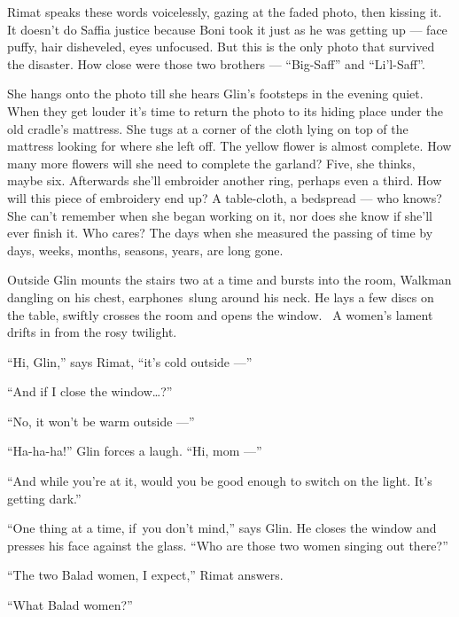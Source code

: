 \documentclass[twoside,11pt,openany]{book}
\begin{document}
Rimat speaks these words voicelessly, gazing at the faded photo, then kissing it.
It doesn't do Saffia
justice because Boni took it just as he was getting up --- face
puffy, hair disheveled,
eyes unfocused. But this is the only photo that survived the
disaster. How close were those two brothers --- ``Big-Saff{}''
and ``Li'l-Saff''.

S{he hangs onto the photo till she hears Glin's footsteps in the
evening quiet. When }they get louder {it's time to return the photo
to its hiding place under the old cradle's mattress. She tugs at a corner of
the}{ }cloth lying on top of the
mattress{ looking for where she left off. The yellow flower is almost
complete. How many more flowers will she need} {to complete the
garland? Five, she }thinks{, maybe six. Afterwards she'll embroider
another }ring, p{erhaps even a third.
}How{ will this piece of embroidery
end }up?{ }A{
table{}-cloth,} a {bedspread --- who knows? She can't remember when
she began working on }it, nor does she know if she'll {ever finish
it. Who cares? }The days when she measured the passing of time by days, weeks, months, seasons, years,  are long
gone.

{Outside Glin }mounts the
stairs {two at a time and bursts into the room, Walkman dangling on
his chest, earphones~}slung{ around his neck. He lays a few discs on
the table, swiftly crosses the room and opens the window.~ A women's lament drifts in from the rosy twilight.}

{ {}``}Hi,{
Glin,'' says Rimat, ``it's cold outside ---''}

``And if I{ close the window{\ldots}?''}

{}``No, it won't be warm outside ---''

{{}``Ha-ha-ha!'' Glin }forces a
laugh. ``Hi, mom ---'' 

{{}``And while you're at it, }would you be good enough to switch on
the light. {It's getting dark.{}''}

``One thing at a time, if~you don't
mind{,'' says Glin. He closes the window and presses his face against
the glass}.{ ``Who are those
}two{ }{women singing out
there?''}

{{}``The two Balad women, I
}expect{,'' Rimat answers.}

{}``What Balad women?''
\end{document}
